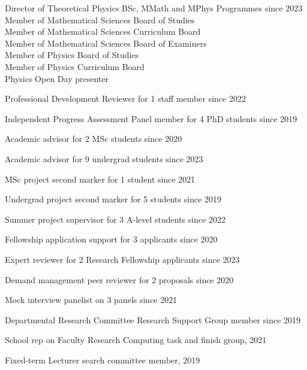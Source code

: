 \documentclass[10 pt]{article}
\newenvironment{tightlist}
  {\begin{list} {} {\setlength{\topsep}{-8 pt} \setlength{\itemsep}{-3 pt} \setlength{\leftmargin}{0 mm}}}{\end{list}}
\newcommand{\blankline}{\quad\pagebreak[2]}
\newcommand{\spacer}{\blankline\vspace{12 pt}\blankline}
\begin{document}
\vspace{-12 pt} %
\begin{tightlist}
  \item Director of Theoretical Physics BSc, MMath and MPhys Programmes since 2023 \\
    \qquad Member of Mathematical Sciences Board of Studies \\
    \qquad Member of Mathematical Sciences Curriculum Board \\
    \qquad Member of Mathematical Sciences Board of Examiners \\
    \qquad Member of Physics Board of Studies \\
    \qquad Member of Physics Curriculum Board \\
    \qquad Physics Open Day presenter
  \item Professional Development Reviewer for 1 staff member since 2022
  \item Independent Progress Assessment Panel member for 4 PhD students since 2019
  \item Academic advisor for 2 MSc students since 2020
  \item Academic advisor for 9 undergrad students since 2023
  \item MSc project second marker for 1 student since 2021
  \item Undergrad project second marker for 5 students since 2019
  \item Summer project supervisor for 3 A-level students since 2022
  \item Fellowship application support for 3 applicants since 2020
  \item Expert reviewer for 2 Research Fellowship applicants since 2023
  \item Demand management peer reviewer for 2 proposals since 2020
  \item Mock interview panelist on 3 panels since 2021
  \item Departmental Research Committee Research Support Group member since 2019
  \item School rep on Faculty Research Computing task and finish group, 2021
  \item Fixed-term Lecturer search committee member, 2019
\end{tightlist}

\spacer



\end{document}

